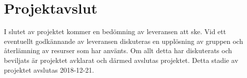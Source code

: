 \documentclass[projektplan/plan.tex]{subfiles}
\begin{document}
\section{Projektavslut}
I slutet av projektet kommer en bedömning av leveransen att ske. Vid ett
eventuellt godkännande av leveransen diskuteras en upplösning av gruppen och
återlämning av resurser som har använts. Om allt detta har diskuterats och
beviljats är projektet avklarat och därmed avslutas projektet. Detta stadie av
projektet avslutas 2018-12-21.
\end{document}

